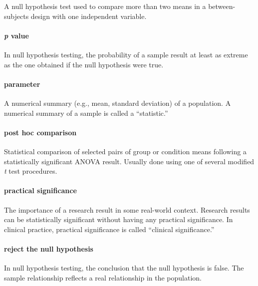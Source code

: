 \documentclass[
]{krantz}
\begin{document}
A null hypothesis test used to compare more than two means in a between-subjects design with one independent variable.

\paragraph*{\texorpdfstring{\emph{p} value}{p value}}\label{p-value}

In null hypothesis testing, the probability of a sample result at least as extreme as the one obtained if the null hypothesis were true.

\paragraph*{parameter}\label{parameter}

A numerical summary (e.g., mean, standard deviation) of a population. A numerical summary of a sample is called a ``statistic.''

\paragraph*{post hoc comparison}\label{post-hoc-comparison}

Statistical comparison of selected pairs of group or condition means following a statistically significant ANOVA result. Usually done using one of several modified \emph{t} test procedures.

\paragraph*{practical significance}\label{practical-significance}

The importance of a research result in some real-world context. Research results can be statistically significant without having any practical significance. In clinical practice, practical significance is called ``clinical significance.''

\paragraph*{reject the null hypothesis}\label{reject-the-null-hypothesis}

In null hypothesis testing, the conclusion that the null hypothesis is false. The sample relationship reflects a real relationship in the population.
\end{document}
